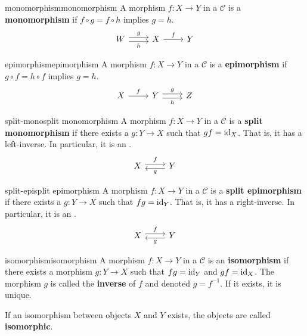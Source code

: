 \begin{topic}{monomorphism}{monomorphism}
    A morphism $f \colon X \to Y$ in a  $\mathcal{C}$ is a \textbf{monomorphism} if $f \circ g = f \circ h$ implies $g = h$.
    \[ \svg \begin{tikzcd} W \arrow[shift left=0.25em]{r}{g} \arrow[shift right=0.25em, swap]{r}{h} & X \arrow{r}{f} & Y \end{tikzcd} \]
\end{topic}

\begin{topic}{epimorphism}{epimorphism}
    A morphism $f \colon X \to Y$ in a  $\mathcal{C}$ is a \textbf{epimorphism} if $g \circ f = h \circ f$ implies $g = h$.
    \[ \svg \begin{tikzcd} X \arrow{r}{f} & Y \arrow[shift left=0.25em]{r}{g} \arrow[shift right=0.25em, swap]{r}{h} & Z \end{tikzcd} \]
\end{topic}

\begin{topic}{split-mono}{split monomorphism}
    A morphism $f \colon X \to Y$ in a  $\mathcal{C}$ is a \textbf{split monomorphism} if there exists a $g \colon Y \to X$ such that $gf = \textup{id}_X$. That is, it has a left-inverse. In particular, it is an .
    \[ \svg \begin{tikzcd} X \arrow[shift left=0.25em]{r}{f} & Y \arrow[shift left=0.25em]{l}{g} \end{tikzcd} \]
\end{topic}

\begin{topic}{split-epi}{split epimorphism}
    A morphism $f \colon X \to Y$ in a  $\mathcal{C}$ is a \textbf{split epimorphism} if there exists a $g \colon Y \to X$ such that $fg = \textup{id}_Y$. That is, it has a right-inverse. In particular, it is an .
    \[ \svg \begin{tikzcd} X \arrow[shift left=0.25em]{r}{f} & Y \arrow[shift left=0.25em]{l}{g} \end{tikzcd} \]
\end{topic}

\begin{topic}{isomorphism}{isomorphism}
    A morphism $f \colon X \to Y$ in a  $\mathcal{C}$ is an \textbf{isomorphism} if there exists a morphism $g \colon Y \to X$ such that $fg = \textup{id}_Y$ and $gf = \textup{id}_X$. The morphism $g$ is called the \textbf{inverse} of $f$ and denoted $g = f^{-1}$. If it exists, it is unique.
    
    If an isomorphism between objects $X$ and $Y$ exists, the objects are called \textbf{isomorphic}.
\end{topic}

